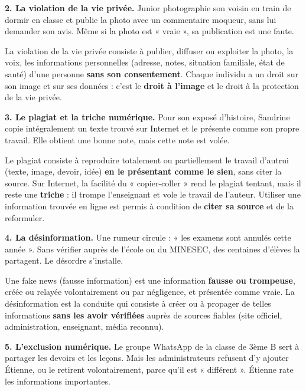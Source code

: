 \documentclass[11pt]{article}
\newcommand{\cle}[1]{{\popxbold\color{popdark}#1}}
\begin{document}
\textbf{2. La violation de la vie privée.} Junior photographie son voisin en train de dormir en classe et publie la photo avec un commentaire moqueur, sans lui demander son avis. Même si la photo est « vraie », sa publication est une faute.

\begin{definition}
La \cle{violation de la vie privée} consiste à publier, diffuser ou exploiter la photo, la voix, les informations personnelles (adresse, notes, situation familiale, état de santé) d'une personne \textbf{sans son consentement}. Chaque individu a un droit sur son image et sur ses données : c'est le \textbf{droit à l'image} et le droit à la protection de la vie privée.
\end{definition}

\textbf{3. Le plagiat et la triche numérique.} Pour son exposé d'histoire, Sandrine copie intégralement un texte trouvé sur Internet et le présente comme son propre travail. Elle obtient une bonne note, mais cette note est volée.

\begin{definition}[Plagiat]
Le \cle{plagiat} consiste à reproduire totalement ou partiellement le travail d'autrui (texte, image, devoir, idée) \textbf{en le présentant comme le sien}, sans citer la source. Sur Internet, la facilité du « copier-coller » rend le plagiat tentant, mais il reste une \textbf{triche} : il trompe l'enseignant et vole le travail de l'auteur. Utiliser une information trouvée en ligne est permis à condition de \textbf{citer sa source} et de la reformuler.
\end{definition}

\textbf{4. La désinformation.} Une rumeur circule : « les examens sont annulés cette année ». Sans vérifier auprès de l'école ou du MINESEC, des centaines d'élèves la partagent. Le désordre s'installe.

\begin{definition}
Une \cle{fake news} (fausse information) est une information \textbf{fausse ou trompeuse}, créée ou relayée volontairement ou par négligence, et présentée comme vraie. La \cle{désinformation} est la conduite qui consiste à créer ou à propager de telles informations \textbf{sans les avoir vérifiées} auprès de sources fiables (site officiel, administration, enseignant, média reconnu).
\end{definition}

\textbf{5. L'exclusion numérique.} Le groupe WhatsApp de la classe de 3ème B sert à partager les devoirs et les leçons. Mais les administrateurs refusent d'y ajouter Étienne, ou le retirent volontairement, parce qu'il est « différent ». Étienne rate les informations importantes.
\end{document}
